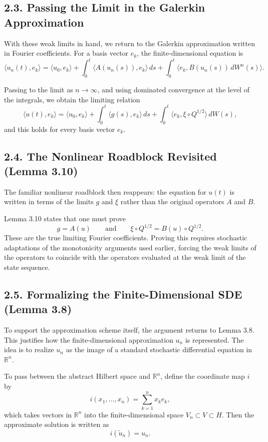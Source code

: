 \documentclass[11pt]{article}
\theoremstyle{definition}
\theoremstyle{remark}
\begin{document}
\subsection*{2.3. Passing the Limit in the Galerkin Approximation}
With these weak limits in hand, we return to the Galerkin approximation written in Fourier coefficients. For a basis vector \(e_k\), the finite-dimensional equation is
\[
\langle u_n(t),e_k\rangle
=
\langle u_0,e_k\rangle
+
\int_0^t \langle A(u_n(s)),e_k\rangle\,ds
+
\int_0^t \langle e_k,B(u_n(s))\,dW^n(s)\rangle.
\]

Passing to the limit as \(n\to\infty\), and using dominated convergence at the level of the integrals, we obtain the limiting relation
\[
\langle u(t),e_k\rangle
=
\langle u_0,e_k\rangle
+
\int_0^t \langle g(s),e_k\rangle\,ds
+
\int_0^t \langle e_k,\xi\circ Q^{1/2}\rangle\,dW(s),
\]
and this holds for every basis vector \(e_k\).

\subsection*{2.4. The Nonlinear Roadblock Revisited (Lemma 3.10)}
The familiar nonlinear roadblock then reappears: the equation for \(u(t)\) is written in terms of the limits \(g\) and \(\xi\) rather than the original operators \(A\) and \(B\).

Lemma 3.10 states that one must prove
\[
g=A(u)
\qquad \text{and} \qquad
\xi\circ Q^{1/2}=B(u)\circ Q^{1/2}.
\]
These are the true limiting Fourier coefficients. Proving this requires stochastic adaptations of the monotonicity arguments used earlier, forcing the weak limits of the operators to coincide with the operators evaluated at the weak limit of the state sequence.

\subsection*{2.5. Formalizing the Finite-Dimensional SDE (Lemma 3.8)}
To support the approximation scheme itself, the argument returns to Lemma 3.8. This justifies how the finite-dimensional approximation \(u_n\) is represented. The idea is to realize \(u_n\) as the image of a standard stochastic differential equation in \(\mathbb R^n\).

To pass between the abstract Hilbert space and \(\mathbb R^n\), define the coordinate map \(i\) by
\[
i(x_1,\dots,x_n)=\sum_{k=1}^n x_k e_k,
\]
which takes vectors in \(\mathbb R^n\) into the finite-dimensional space \(V_n\subset V\subset H\). Then the approximate solution is written as
\[
i(\widetilde u_n)=u_n.
\]
\end{document}
